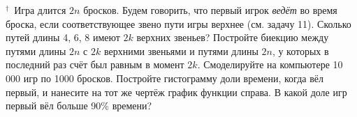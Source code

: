 \par\noindent\begin{minipage}{\linewidth}
\par\noindent\begin{minipage}[t]{\dimexpr\linewidth-7.6cm-1.2em\relax}\vspace{0pt}
\z \unskip$^{\dagger}$\ Игра длится $2n$ бросков. Будем говорить, что первый игрок \textit{ведёт} во время броска, если соответствующее звено пути игры верхнее (см. задачу 11).
 Сколько путей длины 4, 6, 8 имеют $2k$ верхних звеньев?
 Постройте биекцию между путями длины $2n$ с $2k$ верхними звеньями и путями длины $2n$, у которых в последний раз счёт был равным в момент $2k$.
 Смоделируйте на компьютере 10\,000 игр по 1000 бросков. Постройте гистограмму доли времени, когда вёл первый, и нанесите на тот же чертёж график функции справа. В какой доле игр первый вёл больше 90\% времени?


\end{minipage}
\end{minipage}
